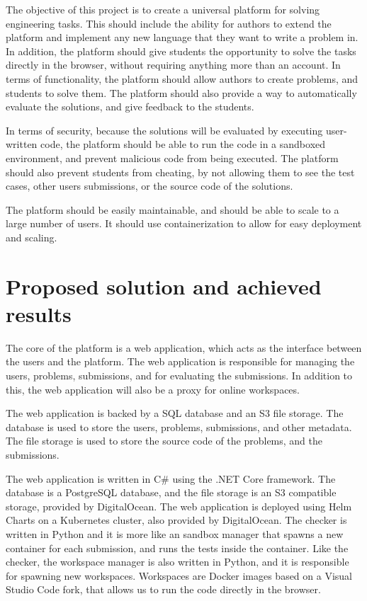 \documentclass[12pt,a4paper]{report}
\begin{document}
The objective of this project is to create a universal platform for solving engineering tasks. This should include the ability for authors to extend the platform and implement any new language that they want to write a problem in. In addition, the platform should give students the opportunity to solve the tasks directly in the browser, without requiring anything more than an account.
In terms of functionality, the platform should allow authors to create problems, and students to solve them. The platform should also provide a way to automatically evaluate the solutions, and give feedback to the students.

In terms of security, because the solutions will be evaluated by executing user-written code, the platform should be able to run the code in a sandboxed environment, and prevent malicious code from being executed. The platform should also prevent students from cheating, by not allowing them to see the test cases, other users submissions, or the source code of the solutions.

The platform should be easily maintainable, and should be able to scale to a large number of users. It should use containerization to allow for easy deployment and scaling.

\section{Proposed solution and achieved results}
The core of the platform is a web application, which acts as the interface between the users and the platform. The web application is responsible for managing the users, problems, submissions, and for evaluating the submissions. In addition to this, the web application will also be a proxy for online workspaces.

The web application is backed by a SQL database and an S3 file storage. The database is used to store the users, problems, submissions, and other metadata. The file storage is used to store the source code of the problems, and the submissions.

The web application is written in C\# using the .NET Core framework. The database is a PostgreSQL database, and the file storage is an S3 compatible storage, provided by DigitalOcean. The web application is deployed using Helm Charts on a Kubernetes cluster, also provided by DigitalOcean. The checker is written in Python and it is more like an sandbox manager that spawns a new container for each submission, and runs the tests inside the container. Like the checker, the workspace manager is also written in Python, and it is responsible for spawning new workspaces. Workspaces are Docker images based on a Visual Studio Code fork, that allows us to run the code directly in the browser.
\end{document}
